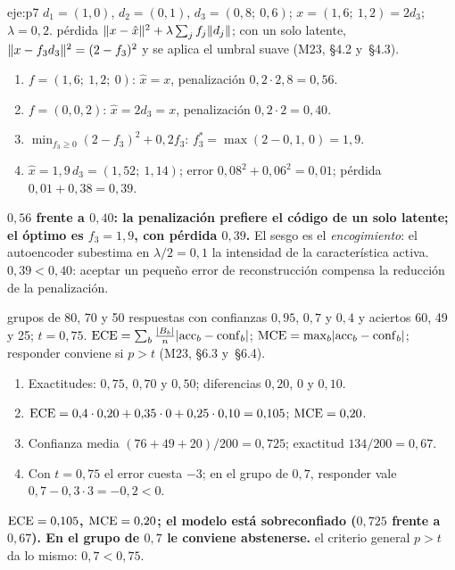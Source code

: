 \begin{solucion}{eje:p7}
\datos $d_1=(1,0)$, $d_2=(0,1)$, $d_3=(0{,}8;\ 0{,}6)$; $x=(1{,}6;\ 1{,}2)=2d_3$; $\lambda=0{,}2$.
\planteamiento pérdida $\lVert x-\hat x\rVert^{2}+\lambda\sum_jf_j\lVert d_j\rVert$; con un solo latente, $\lVert x-f_3d_3\rVert^{2}=(2-f_3)^{2}$ y se aplica el umbral suave (M23, §4.2 y~§4.3).
\pasos
\begin{enumerate}[label=\arabic*.]
  \item $f=(1{,}6;\ 1{,}2;\ 0)$: $\hat x=x$, penalización $0{,}2\cdot 2{,}8=0{,}56$.
  \item $f=(0,0,2)$: $\hat x=2d_3=x$, penalización $0{,}2\cdot 2=0{,}40$.
  \item $\min_{f_3\ge 0}(2-f_3)^{2}+0{,}2f_3$: $f_3^{\ast}=\max(2-0{,}1,\,0)=1{,}9$.
  \item $\hat x=1{,}9\,d_3=(1{,}52;\ 1{,}14)$; error $0{,}08^{2}+0{,}06^{2}=0{,}01$; pérdida $0{,}01+0{,}38=0{,}39$.
\end{enumerate}
\resultado \textbf{$0{,}56$ frente a $0{,}40$: la penalización prefiere el código de un solo latente; el óptimo es $f_3=1{,}9$, con pérdida $0{,}39$.} El sesgo es el \emph{encogimiento}: el autoencoder subestima en $\lambda/2=0{,}1$ la intensidad de la característica activa.
\comprobacion $0{,}39<0{,}40$: aceptar un pequeño error de reconstrucción compensa la reducción de la penalización.

\datos grupos de 80, 70 y 50 respuestas con confianzas $0{,}95$, $0{,}7$ y $0{,}4$ y aciertos 60, 49 y 25; $t=0{,}75$.
\planteamiento $\operatorname{ECE}=\sum_b\frac{\lvert B_b\rvert}{n}\lvert\mathrm{acc}_b-\mathrm{conf}_b\rvert$; $\operatorname{MCE}=\max_b\lvert\mathrm{acc}_b-\mathrm{conf}_b\rvert$; responder conviene si $p>t$ (M23, §6.3 y~§6.4).
\pasos
\begin{enumerate}[label=\arabic*.]
  \item Exactitudes: $0{,}75$, $0{,}70$ y $0{,}50$; diferencias $0{,}20$, $0$ y $0{,}10$.
  \item $\operatorname{ECE}=0{,}4\cdot 0{,}20+0{,}35\cdot 0+0{,}25\cdot 0{,}10=0{,}105$; $\operatorname{MCE}=0{,}20$.
  \item Confianza media $(76+49+20)/200=0{,}725$; exactitud $134/200=0{,}67$.
  \item Con $t=0{,}75$ el error cuesta $-3$; en el grupo de $0{,}7$, responder vale $0{,}7-0{,}3\cdot 3=-0{,}2<0$.
\end{enumerate}
\resultado \textbf{$\operatorname{ECE}=0{,}105$, $\operatorname{MCE}=0{,}20$; el modelo está sobreconfiado ($0{,}725$ frente a $0{,}67$). En el grupo de $0{,}7$ le conviene abstenerse.}
\comprobacion el criterio general $p>t$ da lo mismo: $0{,}7<0{,}75$.


\end{solucion}
